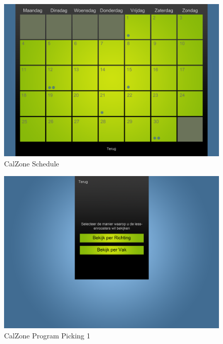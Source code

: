 \begin{center}
\begin{figure}[H]
\caption{CalZone Schedule}
\centerline{\includegraphics[scale=0.4]{img/CalzoneSchedule}}
\label{fig:CalZone Schedule}
\end{figure}

\begin{figure}[H]
\caption{CalZone Program Picking 1}
\centerline{\includegraphics[scale=0.4]{img/Calzoneprogrammepicking}}
\label{fig:CalZone Program Picking}
\end{figure}


\end{center}

